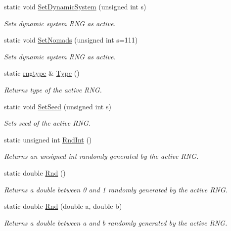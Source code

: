 \begin{DoxyCompactItemize}
static void \hyperlink{class_c_random_generator_aa65cc9adf3c2f97a0def5dd06c9dd8d7}{Set\-Dynamic\-System} (unsigned int s)
\begin{DoxyCompactList}\small\item\em Sets dynamic system R\-N\-G as active. \end{DoxyCompactList}\item 
static void \hyperlink{class_c_random_generator_a4c0c7169a6ddb85202af166d33471add}{Set\-Nomads} (unsigned int s=111)
\begin{DoxyCompactList}\small\item\em Sets dynamic system R\-N\-G as active. \end{DoxyCompactList}\item 
static \hyperlink{class_c_random_generator_a50566d64b5ada7e335fc3acd52d958f6}{rngtype} \& \hyperlink{class_c_random_generator_a12494ce4edd55e80b1e056a4eb6c9b4a}{Type} ()
\begin{DoxyCompactList}\small\item\em Returns type of the active R\-N\-G. \end{DoxyCompactList}\item 
static void \hyperlink{class_c_random_generator_a9b70078540165acee96bea2e5a0e5e91}{Set\-Seed} (unsigned int s)
\begin{DoxyCompactList}\small\item\em Sets seed of the active R\-N\-G. \end{DoxyCompactList}\item 
static unsigned int \hyperlink{class_c_random_generator_a1f014eb89ad575de6637b911a12e612f}{Rnd\-Int} ()
\begin{DoxyCompactList}\small\item\em Returns an unsigned int randomly generated by the active R\-N\-G. \end{DoxyCompactList}\item 
static double \hyperlink{class_c_random_generator_a9fbad91d92f86fadbcdb171f8935893c}{Rnd} ()
\begin{DoxyCompactList}\small\item\em Returns a double between 0 and 1 randomly generated by the active R\-N\-G. \end{DoxyCompactList}\item 
static double \hyperlink{class_c_random_generator_ab4b124328da4ca16ee8971136c9ebb08}{Rnd} (double a, double b)
\begin{DoxyCompactList}\small\item\em Returns a double between a and b randomly generated by the active R\-N\-G. \end{DoxyCompactList}\end{DoxyCompactItemize}
